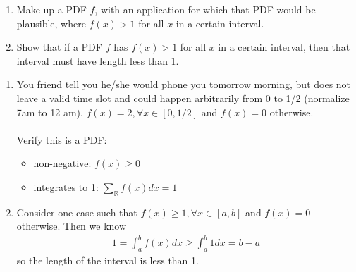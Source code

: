 

\setcounter{theorem}{1}
\begin{exercise}[BH.5.2] \begin{enumerate}
    \item Make up a PDF $f$, with an application for which that PDF would be plausible, where $f(x) > 1$ for all $x$ in a certain interval.
    \item Show that if a PDF $f$ has $f(x) > 1$ for all $x$ in a certain interval, then that interval must have length less than 1.
\end{enumerate}
\begin{solution}
    \begin{enumerate}
        \item You friend tell you he/she would phone you tomorrow morning, but does not leave a valid time slot and could happen arbitrarily from 0 to 1/2 (normalize 7am to 12 am). $f(x)=2, \forall x\in [0,1/2] $ and $f(x)=0$ otherwise. \\~\\
        Verify this is a PDF:
        \begin{itemize}
            \item non-negative: $f(x)\geq 0$
            \item integrates to 1: $\sum_\mathbb{R} f(x) dx=1$
        \end{itemize}
        \item  Consider one case such that $f(x)\geq 1, \forall x\in [a,b] $ and $f(x)=0$ otherwise. Then we know 
        \begin{align*}
            1= \int_{a}^{b} f(x)dx \geq \int_{a}^{b} 1dx = b-a
        \end{align*}
        so the length of the interval is less than 1.
    \end{enumerate}
\end{solution}
\end{exercise}


